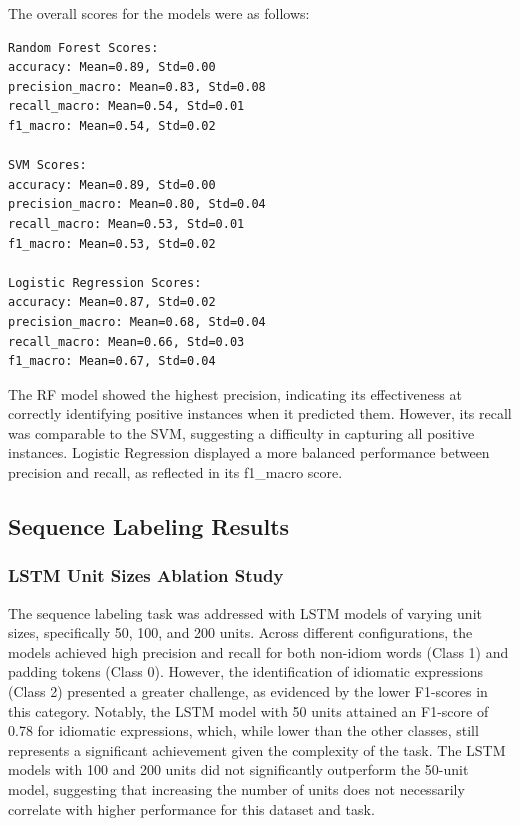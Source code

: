 \documentclass[conference]{IEEEtran}
\begin{document}
The overall scores for the models were as follows:
\begin{verbatim}
Random Forest Scores:
accuracy: Mean=0.89, Std=0.00
precision_macro: Mean=0.83, Std=0.08
recall_macro: Mean=0.54, Std=0.01
f1_macro: Mean=0.54, Std=0.02

SVM Scores:
accuracy: Mean=0.89, Std=0.00
precision_macro: Mean=0.80, Std=0.04
recall_macro: Mean=0.53, Std=0.01
f1_macro: Mean=0.53, Std=0.02

Logistic Regression Scores:
accuracy: Mean=0.87, Std=0.02
precision_macro: Mean=0.68, Std=0.04
recall_macro: Mean=0.66, Std=0.03
f1_macro: Mean=0.67, Std=0.04
\end{verbatim}

The RF model showed the highest precision, indicating its effectiveness at correctly identifying positive instances when it predicted them. However, its recall was comparable to the SVM, suggesting a difficulty in capturing all positive instances. Logistic Regression displayed a more balanced performance between precision and recall, as reflected in its f1\_macro score.

\subsection{Sequence Labeling Results}

\subsubsection{LSTM Unit Sizes Ablation Study}

The sequence labeling task was addressed with LSTM models of varying unit sizes, specifically 50, 100, and 200 units. Across different configurations, the models achieved high precision and recall for both non-idiom words (Class 1) and padding tokens (Class 0). However, the identification of idiomatic expressions (Class 2) presented a greater challenge, as evidenced by the lower F1-scores in this category. Notably, the LSTM model with 50 units attained an F1-score of 0.78 for idiomatic expressions, which, while lower than the other classes, still represents a significant achievement given the complexity of the task. The LSTM models with 100 and 200 units did not significantly outperform the 50-unit model, suggesting that increasing the number of units does not necessarily correlate with higher performance for this dataset and task.
\end{document}
